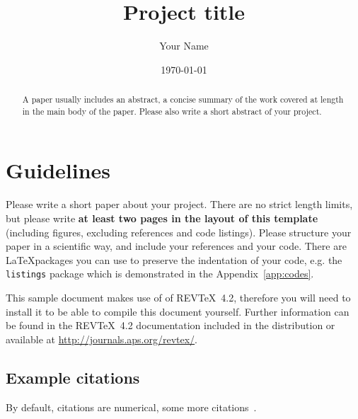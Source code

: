 \documentclass[reprint,amsmath,amssymb,aps,prb]{revtex4-2}
\begin{document}
\title{Project title}

\author{Your Name}

\date{\today}%

\begin{abstract}
A paper usually includes an abstract, a concise summary of the work covered at length in the main body of the paper. Please also write a short abstract of your project.
\end{abstract}


\maketitle


\section{Guidelines}

Please write a short paper about your project. There are no strict length limits, but please write \textbf{at least two pages in the layout of this template} (including figures, excluding references and code listings). Please structure your paper in a scientific way, and include your references and your code. There are \LaTeX packages you can use to preserve the indentation of your code, e.g. the \texttt{listings} package which is demonstrated in the Appendix~\ref{app:codes}.

This sample document makes use of of REV\TeX~4.2, therefore you will need to install it to be able to compile this document yourself. Further information can be found in the REV\TeX~4.2
documentation included in the distribution or available at
\url{http://journals.aps.org/revtex/}.


\subsection{Example citations}
By default, citations are numerical\cite{epr}, some more citations~\cite{feyn54,Bire82,Berman1983,witten2001,Davies1998}. 
\end{document}
